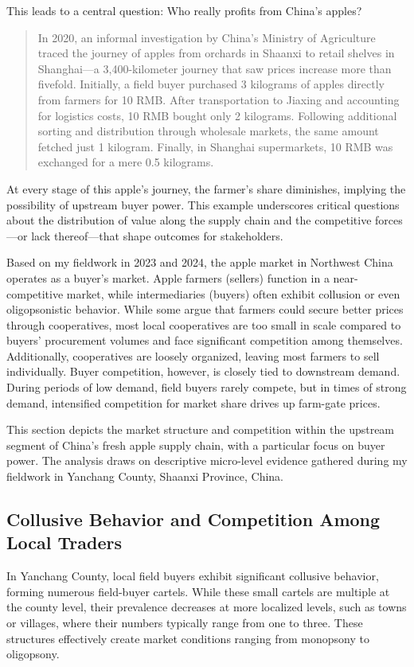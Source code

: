 This leads to a central question: Who really profits from China’s apples?

\begin{quote}
    In 2020, an informal investigation by China’s Ministry of Agriculture traced the journey of apples from orchards in Shaanxi to retail shelves in Shanghai—a 3,400-kilometer journey that saw prices increase more than fivefold. Initially, a field buyer purchased 3 kilograms of apples directly from farmers for 10 RMB. After transportation to Jiaxing and accounting for logistics costs, 10 RMB bought only 2 kilograms. Following additional sorting and distribution through wholesale markets, the same amount fetched just 1 kilogram. Finally, in Shanghai supermarkets, 10 RMB was exchanged for a mere 0.5 kilograms.
\end{quote}

At every stage of this apple's journey, the farmer’s share diminishes, implying the possibility of upstream buyer power. This example underscores critical questions about the distribution of value along the supply chain and the competitive forces—or lack thereof—that shape outcomes for stakeholders.

Based on my fieldwork in 2023 and 2024, the apple market in Northwest China operates as a buyer's market. Apple farmers (sellers) function in a near-competitive market, while intermediaries (buyers) often exhibit collusion or even oligopsonistic behavior. While some argue that farmers could secure better prices through cooperatives, most local cooperatives are too small in scale compared to buyers' procurement volumes and face significant competition among themselves. Additionally, cooperatives are loosely organized, leaving most farmers to sell individually. Buyer competition, however, is closely tied to downstream demand. During periods of low demand, field buyers rarely compete, but in times of strong demand, intensified competition for market share drives up farm-gate prices.

This section depicts the market structure and competition within the upstream segment of China's fresh apple supply chain, with a particular focus on buyer power. The analysis draws on descriptive micro-level evidence gathered during my fieldwork in Yanchang County, Shaanxi Province, China.



\subsection{Collusive Behavior and Competition Among Local Traders}
\noindent 
In Yanchang County, local field buyers exhibit significant collusive behavior, forming numerous field-buyer cartels. While these small cartels are multiple at the county level, their prevalence decreases at more localized levels, such as towns or villages, where their numbers typically range from one to three. These structures effectively create market conditions ranging from monopsony to oligopsony.

